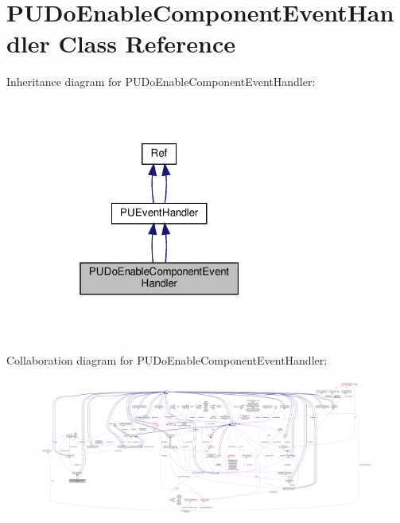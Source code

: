 \hypertarget{classPUDoEnableComponentEventHandler}{}\section{P\+U\+Do\+Enable\+Component\+Event\+Handler Class Reference}
\label{classPUDoEnableComponentEventHandler}


Inheritance diagram for P\+U\+Do\+Enable\+Component\+Event\+Handler\+:
\nopagebreak
\begin{figure}[H]
\begin{center}
\leavevmode
\includegraphics[width=229pt]{classPUDoEnableComponentEventHandler__inherit__graph}
\end{center}
\end{figure}


Collaboration diagram for P\+U\+Do\+Enable\+Component\+Event\+Handler\+:
\nopagebreak
\begin{figure}[H]
\begin{center}
\leavevmode
\includegraphics[width=350pt]{classPUDoEnableComponentEventHandler__coll__graph}
\end{center}
\end{figure}
